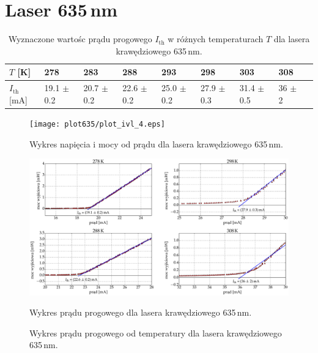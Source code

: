 \section{Laser 635\,nm}
\begin{table}
\begin{center}
\caption{ Wyznaczone wartośc prądu progowego $I_{\mathrm{th}}$ w różnych temperaturach $T$ dla lasera krawędziowego 635\,nm. }
\begin{tabular}{ | C{1.5cm}|  C{1.5cm} | C{1.5cm} | C{1.5cm}| C{1.5cm} | C{1.5cm}| C{1.5cm}| C{2.0cm}| C{2.0cm}|}
\hline
$T$ [K] 	&   278 & 283  	& 288 & 293 & 298 & 303 & 308 \\ \hline
$I_{\mathrm{th}}$ [mA]  &	19.1 $\pm$ 0.2  & 20.7 $\pm$ 0.2 & 22.6 $\pm$ 0.2 &
25.0 $\pm$ 0.2  & 27.9 $\pm$ 0.3 & 31.4 $\pm$ 0.5 & 36 $\pm$ 2	\\ \hline
\end{tabular}
\end{center}
\end{table}
\begin{figure}
\center
  \texttt{[image: plot635/plot\_ivl\_4.eps]}
  \label{rys1}
  \caption{Wykres napięcia i mocy od prądu dla lasera krawędziowego 635\,nm.}
\end{figure}
\begin{figure}
\center
  \includegraphics[scale=0.30]{plot635/plot_i_th_4.eps}
  \label{rys2}
  \caption{Wykres prądu progowego dla lasera krawędziowego 635\,nm.}
\end{figure}
\begin{figure}
\center
  
  \label{rys2}
  \caption{Wykres prądu progowego od temperatury dla lasera krawędziowego 635\,nm.}
\end{figure}
